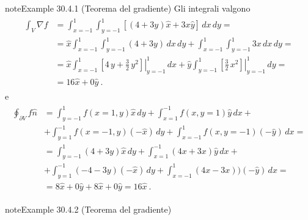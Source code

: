 \documentclass[letterpaper,10pt,italian]{jupyterBook}
\begin{document}
\begin{sphinxadmonition}{note}{Example 30.4.1 (Teorema del gradiente)}
\sphinxAtStartPar
Gli integrali valgono
\begin{equation*}
\begin{split}\begin{aligned}
  \int_V \nabla f
  & = \int_{x=-1}^{1} \int_{y=-1}^{1} \left[ (4 + 3 y) \hat{x} + 3 x \hat{y} \right] \, dx \, dy = \\
  & = \hat{x} \int_{x=-1}^{1} \int_{y=-1}^{1} (4 + 3 y) \, dx \, dy +  \int_{x=-1}^{1} \int_{y=-1}^{1} 3 x \, dx \, dy = \\
  & = \hat{x} \int_{x=-1}^{1} \left.\left[ 4 \, y + \frac{3}{2} \, y^2 \right]\right|_{y=-1}^{1} \, dx
    + \hat{y} \int_{y=-1}^{1} \left.\left[ \frac{3}{2} \, x^2 \right]\right|_{y=-1}^{1} \, dy = \\
  & = 16 \hat{x} + 0 \hat{y} \ .
\end{aligned}\end{split}
\end{equation*}
\sphinxAtStartPar
e
\begin{equation*}
\begin{split}\begin{aligned}
  \oint_{\partial V} f \hat{n}
  & = \int_{y = -1}^{ 1} f(x= 1, y   ) \hat{x} \, dy 
    + \int_{x =  1}^{-1} f(x   , y= 1) \hat{y} \, dx + \\ 
  & + \int_{y =  1}^{-1} f(x=-1, y   ) (- \hat{x} ) \, dy 
    + \int_{x = -1}^{ 1} f(x   , y=-1) (- \hat{y} ) \, dx = \\
  & = \int_{y = -1}^{ 1} ( 4     + 3     y )  \hat{x} \, dy 
    + \int_{x =  1}^{-1} ( 4  x  + 3  x    )  \hat{y} \, dx + \\ 
  & + \int_{y =  1}^{-1} (-4     - 3     y )  (- \hat{x} ) \, dy 
    + \int_{x = -1}^{ 1} ( 4  x  - 3  x   ))  (- \hat{y} ) \, dx = \\
  & = 8 \hat{x} + 0 \hat{y} + 8 \hat{x} + 0 \hat{y}
    = 16 \hat{x} \ .
\end{aligned}\end{split}
\end{equation*}\end{sphinxadmonition}
\label{ch/vector-calculus/stokes:thm-gradient-2}
\begin{sphinxadmonition}{note}{Example 30.4.2 (Teorema del gradiente)}


\end{sphinxadmonition}
\end{document}
